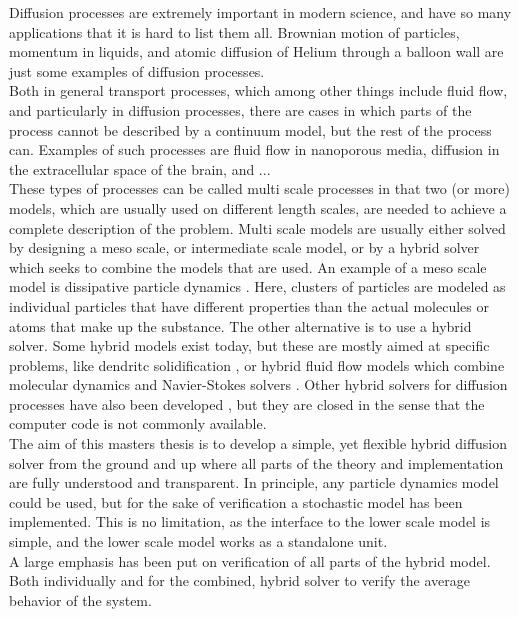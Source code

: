 Diffusion processes are extremely important in modern science, and have so many applications that it is hard to list them all. 
Brownian motion of particles, momentum in liquids, and atomic diffusion of Helium through a balloon wall are just some examples of diffusion processes. \\
\noindent Both in general transport processes, which among other things include fluid flow, and particularly in diffusion processes, there are cases in which parts of the process cannot be described by a continuum model, but the rest of the process can. 
Examples of such processes are fluid flow in nanoporous media, diffusion in the extracellular space of the brain, and ...\\

\noindent These types of processes can be called multi scale processes in that two (or more) models, which are usually used on different length scales, are needed to achieve a complete description of the problem. 
Multi scale models are usually either solved by designing a meso scale, or intermediate scale model, or by a hybrid solver which seeks to combine the models that are used. 
An example of a meso scale model is dissipative particle dynamics \cite{}. 
Here, clusters of particles are modeled as individual particles that have different properties than the actual molecules or atoms that make up the substance. 
The other alternative is to use a hybrid solver. 
Some hybrid models exist today, but these are mostly aimed at specific problems, like dendritc solidification \cite{plapp2000multiscale}, or hybrid fluid flow models which combine molecular dynamics and Navier-Stokes solvers \cite{o1995molecular}. 
Other hybrid solvers for diffusion processes have also been developed \cite{flekkoy2001coupling}, but they are closed in the sense that the computer code is not commonly available. \\

\noindent The aim of this masters thesis is to develop a simple, yet flexible hybrid diffusion solver from the ground and up where all parts of the theory and implementation are fully understood and transparent. 
In principle, any particle dynamics model could be used, but for the sake of verification a stochastic model has been implemented. 
This is no limitation, as the interface to the lower scale model is simple, and the lower scale model works as a standalone unit. \\

\noindent A large emphasis has been put on verification of all parts of the hybrid model. 
Both individually and for the combined, hybrid solver to verify the average behavior of the system.\\

